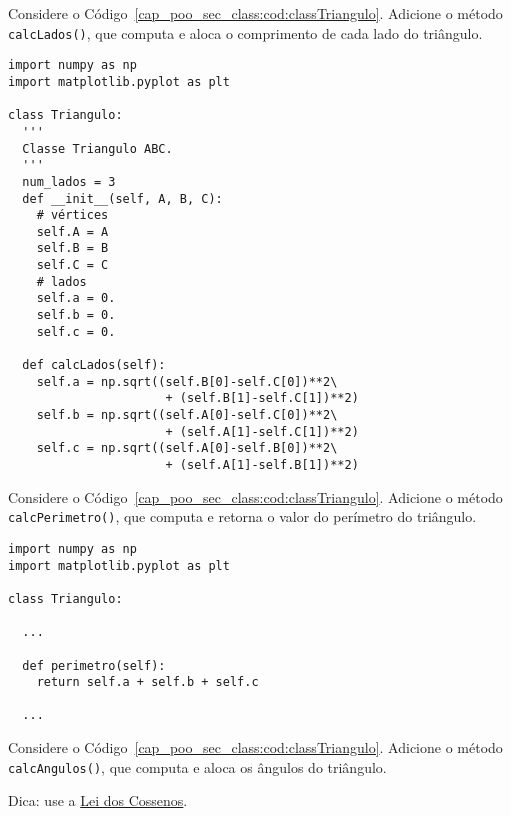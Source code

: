 \begin{exer}
  Considere o Código~\ref{cap_poo_sec_class:cod:classTriangulo}. Adicione o método \lstinline+calcLados()+, que computa e aloca o comprimento de cada lado do triângulo.
\end{exer}
\begin{resp}

\begin{lstlisting}
import numpy as np
import matplotlib.pyplot as plt

class Triangulo:
  '''
  Classe Triangulo ABC.
  '''
  num_lados = 3
  def __init__(self, A, B, C):
    # vértices
    self.A = A
    self.B = B
    self.C = C
    # lados
    self.a = 0.
    self.b = 0.
    self.c = 0.

  def calcLados(self):
    self.a = np.sqrt((self.B[0]-self.C[0])**2\
                      + (self.B[1]-self.C[1])**2)
    self.b = np.sqrt((self.A[0]-self.C[0])**2\
                      + (self.A[1]-self.C[1])**2)
    self.c = np.sqrt((self.A[0]-self.B[0])**2\
                      + (self.A[1]-self.B[1])**2)
\end{lstlisting}

\end{resp}

\begin{exer}
  Considere o Código~\ref{cap_poo_sec_class:cod:classTriangulo}. Adicione o método \lstinline+calcPerimetro()+, que computa e retorna o valor do perímetro do triângulo.
\end{exer}
\begin{resp}

\begin{lstlisting}
import numpy as np
import matplotlib.pyplot as plt

class Triangulo:

  ...

  def perimetro(self):
    return self.a + self.b + self.c

  ...
\end{lstlisting}

\end{resp}

\begin{exer}
  Considere o Código~\ref{cap_poo_sec_class:cod:classTriangulo}. Adicione o método \lstinline+calcAngulos()+, que computa e aloca os ângulos do triângulo.
\end{exer}
\begin{resp}
  Dica: use a \href{https://pt.wikipedia.org/wiki/Lei_dos_cossenos}{Lei dos Cossenos}.
\end{resp}

